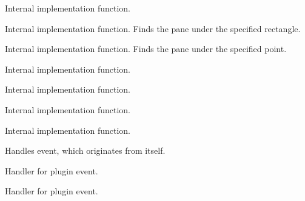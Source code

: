 Internal implementation function.


\label{cbbardragpluginhittestpanes}


Internal implementation function. Finds the pane
under the specified rectangle.



Internal implementation function. Finds the pane
under the specified point.


\label{cbbardragpluginhitspane}


Internal implementation function.


\label{cbbardragpluginisinclientarea}


Internal implementation function.



Internal implementation function.


\label{cbbardragpluginisinotherpane}


Internal implementation function.


\label{cbbardragpluginondrawhintrect}


Handles event, which originates from itself.


\label{cbbardragpluginonlbuttondown}


Handler for plugin event.


\label{cbbardragpluginonlbuttonup}


Handler for plugin event.


